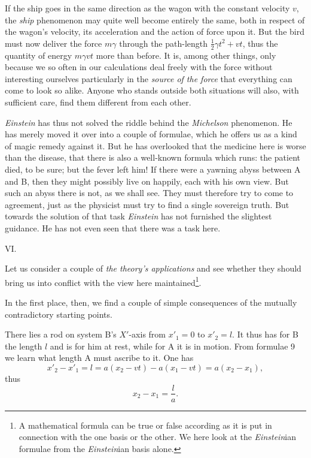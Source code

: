 \documentclass[12pt,a4paper]{article}
\begin{document}
If the ship goes in the same direction as the wagon with the constant velocity
$v$, the \emph{ship} phenomenon may quite well become entirely the same, both
in respect of the wagon's velocity, its acceleration and the action of force
upon it. But the bird must now deliver the force $m\gamma$ through the
path-length $\tfrac{1}{2}\gamma t^{2} + vt$, thus the quantity of energy
$m\gamma vt$ more than before. It is, among other things, only because we so
often in our calculations deal freely with the force without interesting
ourselves particularly in the \emph{source of the force} that everything can
come to look so alike. Anyone who stands outside both situations will also,
with sufficient care, find them different from each other.

\emph{Einstein} has thus not solved the riddle behind the \emph{Michelson}
phenomenon. He has merely moved it over into a couple of formulae, which he
offers us as a kind of magic remedy against it. But he has overlooked that the
medicine here is worse than the disease, that there is also a well-known
formula which runs: the patient died, to be sure; but the fever left him! If
there were a yawning abyss between A and B, then they might possibly live on
happily, each with his own view. But such an abyss there is not, as we shall
see. They must therefore try to come to agreement, just as the physicist must
try to find a single sovereign truth. But towards the solution of that task
\emph{Einstein}
has not furnished the slightest guidance. He has not even seen that there was
a task here.

\begin{center}
VI.
\end{center}

Let us consider a couple of \emph{the theory's applications} and see whether
they should bring us into conflict with the view here maintained\footnote{A
mathematical formula can be true or false according as it is put in connection
with the one basis or the other. We here look at the \emph{Einstein}ian
formulae from the \emph{Einstein}ian basis alone.}.

In the first place, then, we find a couple of simple consequences of the
mutually contradictory starting points.

There lies a rod on system B's $X'$-axis from $x'_{1} = 0$ to $x'_{2} = l$. It
thus has for B the length $l$ and is for him at rest, while for A it is in
motion. From formulae 9 we learn what length A must ascribe to it. One has
\[
  x'_{2} - x'_{1} = l = a(x_{2} - vt) - a(x_{1} - vt) = a(x_{2} - x_{1}),
\]
thus
\[
  x_{2} - x_{1} = \frac{l}{a}.
\]
\end{document}
